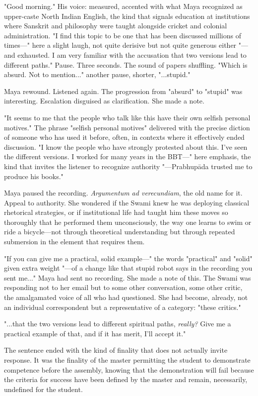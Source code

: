 \documentclass[12pt]{article}
\begin{document}
"Good morning." His voice: measured, accented with what Maya recognized as upper-caste North Indian English, the kind that signals education at institutions where Sanskrit and philosophy were taught alongside cricket and colonial administration. "I find this topic to be one that has been discussed millions of times—" here a slight laugh, not quite derisive but not quite generous either "—and exhausted. I am very familiar with the accusation that two versions lead to different paths." Pause. Three seconds. The sound of papers shuffling. "Which is absurd. Not to mention..." another pause, shorter, "...stupid."

Maya rewound. Listened again. The progression from "absurd" to "stupid" was interesting. Escalation disguised as clarification. She made a note.

"It seems to me that the people who talk like this have their own selfish personal motives." The phrase "selfish personal motives" delivered with the precise diction of someone who has used it before, often, in contexts where it effectively ended discussion. "I know the people who have strongly protested about this. I've seen the different versions. I worked for many years in the BBT—" here emphasis, the kind that invites the listener to recognize authority "—Prabhupāda trusted me to produce his books."

Maya paused the recording. \textit{Argumentum ad verecundiam}, the old name for it. Appeal to authority. She wondered if the Swami knew he was deploying classical rhetorical strategies, or if institutional life had taught him these moves so thoroughly that he performed them unconsciously, the way one learns to swim or ride a bicycle—not through theoretical understanding but through repeated submersion in the element that requires them.

"If you can give me a practical, solid example—" the words "practical" and "solid" given extra weight "—of a change like that stupid robot says in the recording you sent me..." Maya had sent no recording. She made a note of this. The Swami was responding not to her email but to some other conversation, some other critic, the amalgamated voice of all who had questioned. She had become, already, not an individual correspondent but a representative of a category: "these critics."

"...that the two versions lead to different spiritual paths, \textit{really?} Give me a practical example of that, and if it has merit, I'll accept it."

The sentence ended with the kind of finality that does not actually invite response. It was the finality of the master permitting the student to demonstrate competence before the assembly, knowing that the demonstration will fail because the criteria for success have been defined by the master and remain, necessarily, undefined for the student.
\end{document}
